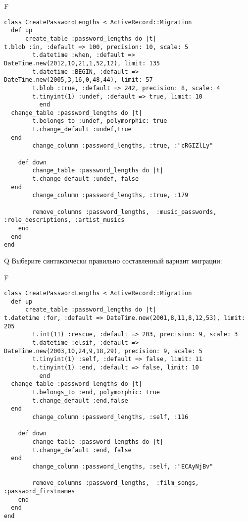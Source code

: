 F
\begin{verbatim}
class CreatePasswordLengths < ActiveRecord::Migration
  def up
	  create_table :password_lengths do |t|
t.blob :in, :default => 100, precision: 10, scale: 5
		t.datetime :when, :default => DateTime.new(2012,10,21,1,52,12), limit: 135
		t.datetime :BEGIN, :default => DateTime.new(2005,3,16,0,48,44), limit: 57
		t.blob :true, :default => 242, precision: 8, scale: 4
		t.tinyint(1) :undef, :default => true, limit: 10
		  end
  change_table :password_lengths do |t|
		t.belongs_to :undef, polymorphic: true
 		t.change_default :undef,true
  end
 		change_column :password_lengths, :true, :"cRGIZlLy"
   
	def down
		change_table :password_lengths do |t|
		t.change_default :undef, false
  end
 		change_column :password_lengths, :true, :179
   
		remove_columns :password_lengths,  :music_passwords, :role_descriptions, :artist_musics 
    end 
  end
end

\end{verbatim}

Q
Выберите синтаксически правильно составленный вариант миграции:

F
\begin{verbatim}
class CreatePasswordLengths < ActiveRecord::Migration
  def up
	  create_table :password_lengths do |t|
t.datetime :for, :default => DateTime.new(2001,8,11,8,12,53), limit: 205
		t.int(11) :rescue, :default => 203, precision: 9, scale: 3
		t.datetime :elsif, :default => DateTime.new(2003,10,24,9,18,29), precision: 9, scale: 5
		t.tinyint(1) :self, :default => false, limit: 11
		t.tinyint(1) :end, :default => false, limit: 10
		  end
  change_table :password_lengths do |t|
		t.belongs_to :end, polymorphic: true
 		t.change_default :end,false
  end
 		change_column :password_lengths, :self, :116
   
	def down
		change_table :password_lengths do |t|
		t.change_default :end, false
  end
 		change_column :password_lengths, :self, :"ECAyNjBv"
   
		remove_columns :password_lengths,  :film_songs, :password_firstnames 
    end 
  end
end

\end{verbatim}

